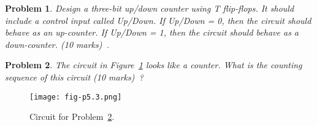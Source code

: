 \documentclass[twocolumn]{article}
\newtheorem{prob}{Problem}
\begin{document}
\begin{prob}
  Design a three-bit up/down counter using T flip-flops. It should include a control input
  called Up/Down. If Up/Down = 0, then the circuit should behave as an up-counter. If
  Up/Down = 1, then the circuit should behave as a down-counter. 
  (10 marks)~\cite[Prob 5.15]{brown2013fundamentals}.
\end{prob}

\begin{prob}
  The circuit in Figure~\ref{fig:p5.3} looks like a counter. What is the
  counting sequence of this circuit (10 marks)~\cite[Prob 5.17]{brown2013fundamentals}?
  \label{prob:6}
\end{prob}
\begin{figure}[ht!]
  \texttt{[image: fig-p5.3.png]}
  \caption{Circuit for Problem~\ref{prob:6}.}
    \label{fig:p5.3}
\end{figure}



\end{document}
